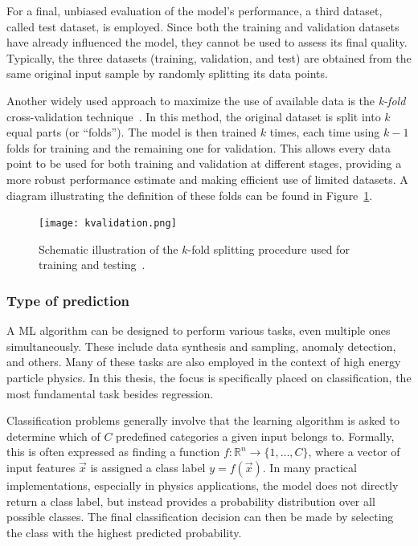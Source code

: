 For a final, unbiased evaluation of the model’s performance, a third dataset, called test dataset, is employed. Since both the training and validation datasets have already influenced the model, they cannot be used to assess its final quality. Typically, the three datasets (training, validation, and test) are obtained from the same original input sample by randomly splitting its data points.

Another widely used approach to maximize the use of available data is the \textit{k-fold} cross-validation technique~\cite{tmvatoolkit}. In this method, the original dataset is split into $k$ equal parts (or ``folds''). The model is then trained $k$ times, each time using $k-1$ folds for training and the remaining one for validation. This allows every data point to be used for both training and validation at different stages, providing a more robust performance estimate and making efficient use of limited datasets. A diagram illustrating the definition of these folds can be found in Figure~\ref{fig:kfold}.
\begin{figure}[htbp]
    \centering
    \texttt{[image: kvalidation.png]}
    \caption{Schematic illustration of the $k$-fold splitting procedure used for training and testing~\cite{scikit_learn_cv}.}
    \label{fig:kfold}
\end{figure}

\subsubsection*{Type of prediction}
A ML algorithm can be designed to perform various tasks, even multiple ones simultaneously. These include data synthesis and sampling, anomaly detection, and others. Many of these tasks are also employed in the context of high energy particle physics.
In this thesis, the focus is specifically placed on classification, the most fundamental task besides regression.

Classification problems generally involve that the learning algorithm is asked to determine which of $C$ predefined categories a given input belongs to. Formally, this is often expressed as finding a function $f: \mathbb{R}^n \rightarrow \{1, \dots, C\}$, where a vector of input features $\vec{x}$ is assigned a class label $y = f(\vec{x})$. In many practical implementations, especially in physics applications, the model does not directly return a class label, but instead provides a probability distribution over all possible classes. The final classification decision can then be made by selecting the class with the highest predicted probability.

